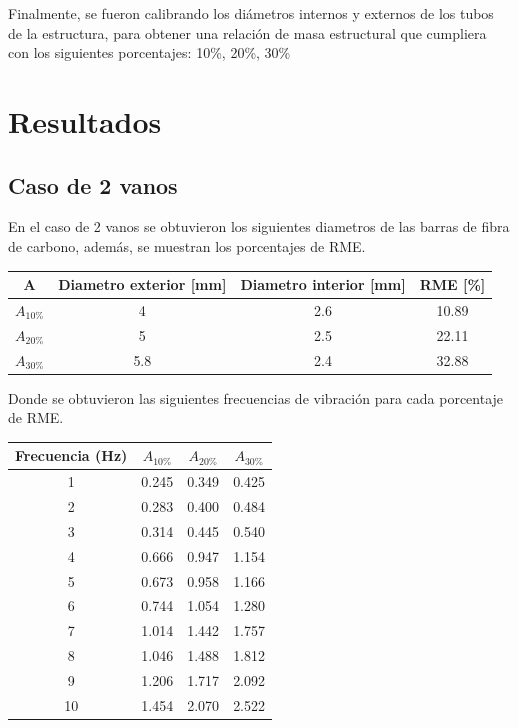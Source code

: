 Finalmente, se fueron calibrando los diámetros internos y externos de los tubos de la estructura, para obtener una relación de masa estructural que cumpliera con los siguientes porcentajes: 10\%, 20\%, 30\%


\section{Resultados}


\subsection{Caso de 2 vanos}
En el caso de 2 vanos se obtuvieron los siguientes diametros de las barras de fibra de carbono, además, se muestran los porcentajes de RME.

\begin{table}[H]
    \centering
    \begin{tabular}{cccc}
    \toprule
     A & Diametro exterior [mm] & Diametro interior [mm] & RME [\%] \\
    \midrule
     $A_{10\%}$ &  4 &  2.6 &  10.89 \\
     $A_{20\%}$ &  5 &  2.5 &  22.11 \\
     $A_{30\%}$ &  5.8 &  2.4 &  32.88 \\
    \bottomrule
    \end{tabular}
\end{table}

Donde se obtuvieron las siguientes frecuencias de vibración para cada porcentaje de RME.

\begin{table}[H]
    \centering
    \begin{tabular}{cccc}
    \toprule
     Frecuencia (Hz) & $A_{10\%}$ & $A_{20\%}$ & $A_{30\%}$ \\
    \midrule
     1 &  0.245 &  0.349 &  0.425 \\
     2 &  0.283 &  0.400 &  0.484 \\
     3 &  0.314 &  0.445 &  0.540 \\
     4 &  0.666 &  0.947 &  1.154 \\
     5 &  0.673 &  0.958 &  1.166 \\
     6 &  0.744 &  1.054 &  1.280 \\
     7 &  1.014 &  1.442 &  1.757 \\
     8 &  1.046 &  1.488 &  1.812 \\
     9 &  1.206 &  1.717 &  2.092 \\
     10 &  1.454 &  2.070 &  2.522 \\
    \bottomrule
    \end{tabular}
\end{table}

